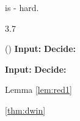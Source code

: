 \begin{lemma}
     is \tp - hard.
\end{lemma}

\begin{lemma}
{3.7}
\end{lemma}

\begin{problem}{ ()}
    \tab \textbf{Input:}
    \tab \textbf{Decide:}
\end{problem}

\begin{problem}{}
    \tab \textbf{Input:}
    \tab \textbf{Decide:}
\end{problem}

\begin{claimproof}{Lemma \ref{lem:red1}}
\end{claimproof}

\begin{claimproof}{\ref{thm:dwin}}
\end{claimproof}

